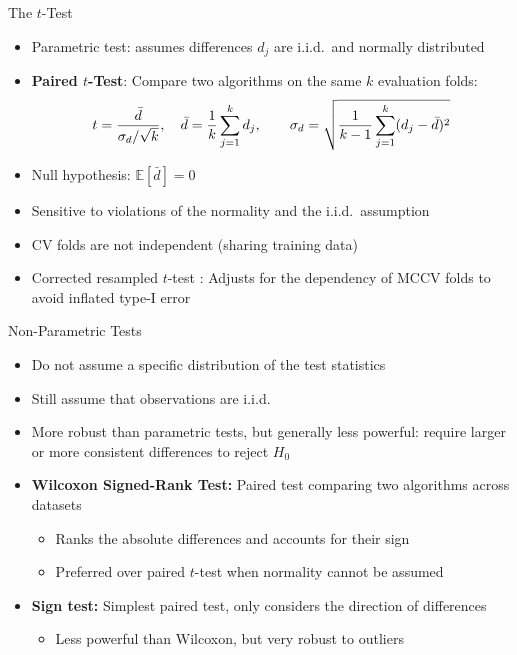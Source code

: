 \documentclass[main]{subfiles}
\begin{document}
\begin{frame}{The $t$-Test}
    \begin{itemize}
        \item Parametric test: assumes differences $d_j$ are i.i.d.\ and normally distributed
        \item \textbf{Paired $t$-Test}: Compare two algorithms on the same $k$ evaluation folds:
        \[
        t = \frac{\bar{d}}{\sigma_d / \sqrt{k}}, \quad \bar{d} = \frac{1}{k} \sum_{j=1}^k d_j, \qquad \sigma_d = \sqrt{\frac{1}{k-1}\sum_{j=1}^k (d_j - \bar{d})^2}
        \]
        \item Null hypothesis: $\mathbb{E}[\bar{d}] = 0$
        \item Sensitive to violations of the normality and the i.i.d.\ assumption
        \item CV folds are not independent (sharing training data)
        \item Corrected resampled $t$-test : Adjusts for the dependency of MCCV folds to avoid inflated type-I error
    \end{itemize}
\end{frame}

\begin{frame}{Non-Parametric Tests}
    \begin{itemize}
        \item Do not assume a specific distribution of the test statistics 
        \item Still assume that observations are i.i.d.
        \item More robust than parametric tests, but generally \alert{less powerful}: require larger or more consistent differences to reject $H_0$
        \item \textbf{Wilcoxon Signed-Rank Test:} Paired test comparing two algorithms across datasets
        \begin{itemize}
            \item Ranks the absolute differences and accounts for their sign
            \item Preferred over paired $t$-test when normality cannot be assumed
        \end{itemize}
        \item \textbf{Sign test:} Simplest paired test, only considers the direction of differences
        \begin{itemize}
            \item Less powerful than Wilcoxon, but very robust to outliers
        \end{itemize}
    \end{itemize}
\end{frame}
\end{document}
